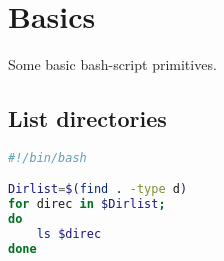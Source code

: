 \section{Basics}
Some basic bash-script primitives.
\subsection{List directories}
\lstset{basicstyle=\scriptsize, numbers=left, captionpos=b, tabsize=4}
\begin{lstlisting}[caption=Build and Link,language={Bash},
xleftmargin=20pt, label=lst:firstNamsProgram]
#!/bin/bash

Dirlist=$(find . -type d)
for direc in $Dirlist; 
do
	ls $direc
done
\end{lstlisting}
